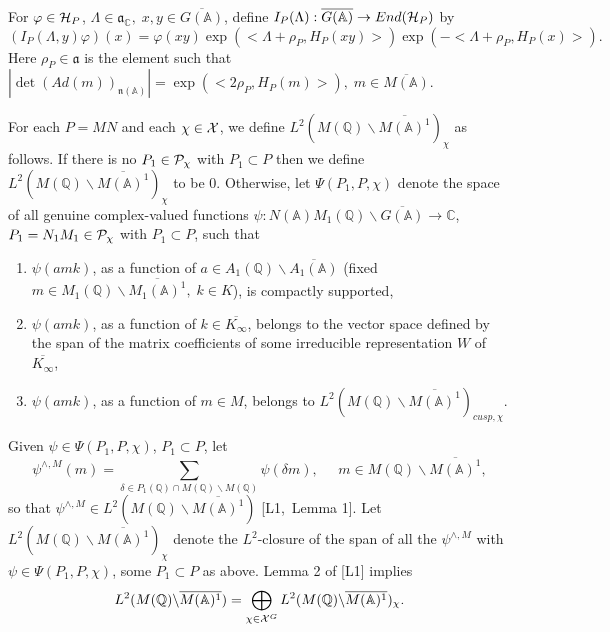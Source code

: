 For $\varphi \in {\cal H}_P$,
$\Lambda \in {\mathfrak{a}}_{{\mathbb C}},\;x,y\in \overline{G({\mathbb{A}})}$,
define $I_P(\Lambda ):\overline{G({\mathbb{A}})}\rightarrow End({\cal H}_P)$ by 
\[
(I_P(\Lambda ,y)\varphi )(x)=\varphi (xy)\exp (<\Lambda +\rho
_P,H_P(xy)>)\exp (-<\Lambda +\rho _P,H_P(x)>). 
\]
Here $\rho _P\in {\mathfrak{a}}$ is the element such that
$|\det (Ad(m))_{{\mathfrak{n}}({\mathbb A})}|
=\exp (<2\rho _P,H_P(m)>),\;m\in \overline{M({\mathbb{A}})}$.

For each $P=MN$ and each $\chi \in {\cal X}$, we define
$L^2(M({\mathbb{Q}})\backslash \overline{M({\mathbb{A}})^1})_\chi $
as follows. If there is no $P_1\in {\cal P}_\chi $
with $P_1\subset P$ then we define
$L^2(M({{\mathbb{Q}}})\backslash \overline{M({\mathbb{A}})^1})_\chi $
to be $0$. Otherwise, let $\Psi (P_1,P,\chi )$ denote the space of
all genuine complex-valued functions
$\psi :N({\mathbb{A}})M_1({\mathbb{Q}})\backslash \overline{G({\mathbb{A}})}
\rightarrow {\mathbb C}$, $P_1=N_1M_1\in {\cal{P}}_\chi $ 
with $P_1\subset P$, such that

\begin{enumerate}
\item  $\psi (amk)$, as a function of 
$a\in A_1({\mathbb{Q}})\backslash \overline{A_1({\mathbb{A}})}$ (fixed 
$m\in M_1({\mathbb{Q}})\backslash \overline{M_1({\mathbb{A}})^1},\;k\in K$),
is compactly supported,

\item  $\psi (amk)$, as a function of $k\in \overline{K_\infty}$,
belongs to the
vector space defined by the span of the matrix coefficients of some
irreducible representation $W$ of $\overline{K_\infty}$,

\item  $\psi (amk)$, as a function of $m\in M$, belongs to 
$L^2(M({{\mathbb{Q}}})\backslash \overline{M({\mathbb{A}})^1})_{cusp,\chi }$.
\end{enumerate}

Given $\psi \in \Psi (P_1,P,\chi )$, $P_1\subset P$, let 
\[
\psi ^{\wedge ,M}(m)=
\sum_{\delta \in P_1({\mathbb{Q}})\cap
M({\mathbb{Q}})\backslash M({\mathbb{Q}})}
\psi (\delta m),\;\;\;\;\;
m\in M({\mathbb{Q}})\backslash \overline{M({\mathbb{A}})^1}, 
\]
so that
$\psi ^{\wedge ,M}\in
L^2(M({\mathbb{Q}})\backslash \overline{M({\mathbb{A}})^1})$
[L1,\ Lemma 1]. Let
$L^2(M({\mathbb{Q}})\backslash \overline{M({\mathbb{A}})^1})_\chi $ denote
the $L^2$-closure of the span of all the
$\psi ^{\wedge ,M}$ with $\psi \in \Psi (P_1,P,\chi )$,
some $P_1\subset P$ as above. Lemma 2 of [L1] implies 
\begin{equation}
L^2(M({\mathbb{Q}})\backslash \overline{M({\mathbb{A}})^1})
=\bigoplus_{\chi \in {\cal X}^G}
L^2(M({\mathbb{Q}})\backslash \overline{M({\mathbb{A}})^1})_\chi .
\end{equation}


